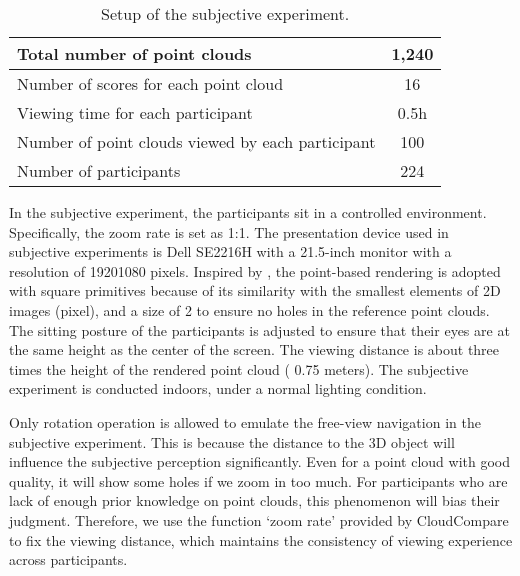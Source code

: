 \documentclass[acmsmall]{acmart}
\begin{document}
\begin{table}[htbp]
  \centering
  \caption{Setup of the subjective experiment.}
  \begin{footnotesize}
    \begin{tabular}{p{13.055em}|c}
    \hline
    Total number of point clouds & 1,240 \\
    \hline
    Number of scores \newline{}for each point cloud & 16 \\
    \hline
    Viewing time \newline{}for each participant & 0.5h \\
    \hline
    Number of point clouds\newline{} viewed by each participant & 100 \\
    \hline
    Number of participants & 224 \\
    \hline
    \end{tabular}\end{footnotesize}
  \label{Configuration}\end{table}


\par In the subjective experiment, the participants sit in a controlled environment. Specifically, the zoom rate is set as 1:1. The presentation device used in subjective experiments is Dell SE2216H with a 21.5-inch monitor with a resolution of 19201080 pixels. Inspired by \cite{Javaheri2019IRPC,Yang2020TMM3DTO2D}, the point-based rendering is adopted with square primitives because of its similarity with the smallest elements of 2D images (pixel), and a size of 2 to ensure no holes in the reference point clouds. The sitting posture of the participants is adjusted to ensure that their eyes are at the same height as the center of the screen. The viewing distance is about three times the height of the rendered point cloud ( 0.75 meters). The subjective experiment is conducted indoors, under a normal lighting condition.

\par Only rotation operation is allowed to emulate the free-view navigation in the subjective experiment. This is because the distance to the 3D object will influence the subjective perception significantly. Even for a point cloud with good quality, it will show some holes if we zoom in too much. For participants who are lack of enough prior knowledge on point clouds, this phenomenon will bias their judgment. Therefore, we use the function ‘zoom rate’ provided by CloudCompare to fix the viewing distance, which maintains the consistency of viewing experience across participants.
\end{document}

